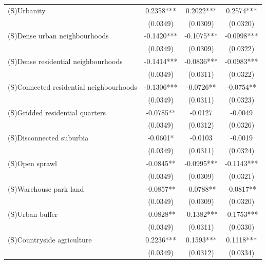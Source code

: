 \documentclass[]{interact}
\theoremstyle{plain}%
\theoremstyle{definition}
\theoremstyle{remark}
\begin{document}
\begin{table}
\begin{tabular}{lccc}
(S)Urbanity                                       &   0.2358*** &   0.2022*** &   0.2574*** \\
                                                  &    (0.0349) &    (0.0309) &    (0.0320) \\
(S)Dense urban neighbourhoods                     &  -0.1420*** &  -0.1075*** &  -0.0998*** \\
                                                  &    (0.0349) &    (0.0309) &    (0.0322) \\
(S)Dense residential neighbourhoods               &  -0.1414*** &  -0.0836*** &  -0.0983*** \\
                                                  &    (0.0349) &    (0.0311) &    (0.0322) \\
(S)Connected residential neighbourhoods           &  -0.1306*** &   -0.0726** &   -0.0754** \\
                                                  &    (0.0349) &    (0.0311) &    (0.0323) \\
(S)Gridded residential quarters                   &   -0.0785** &     -0.0127 &     -0.0049 \\
                                                  &    (0.0349) &    (0.0312) &    (0.0326) \\
(S)Disconnected suburbia                          &    -0.0601* &     -0.0103 &     -0.0019 \\
                                                  &    (0.0349) &    (0.0311) &    (0.0324) \\
(S)Open sprawl                                    &   -0.0845** &  -0.0995*** &  -0.1143*** \\
                                                  &    (0.0349) &    (0.0309) &    (0.0321) \\
(S)Warehouse park land                            &   -0.0857** &   -0.0788** &   -0.0817** \\
                                                  &    (0.0349) &    (0.0309) &    (0.0320) \\
(S)Urban buffer                                   &   -0.0828** &  -0.1382*** &  -0.1753*** \\
                                                  &    (0.0349) &    (0.0311) &    (0.0330) \\
(S)Countryside agriculture                        &   0.2236*** &   0.1593*** &   0.1118*** \\
                                                  &    (0.0349) &    (0.0312) &    (0.0334) \\

\end{tabular}
\end{table}
\end{document}
